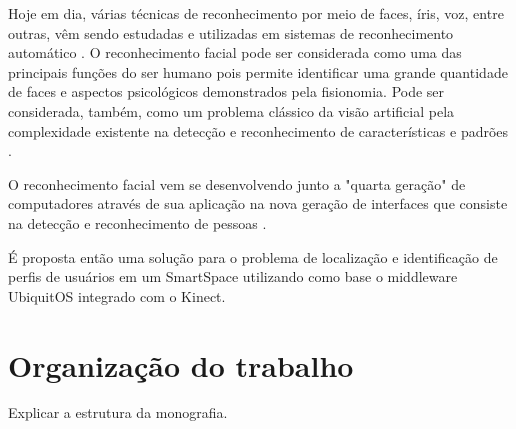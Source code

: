 Hoje em dia, várias técnicas de reconhecimento por meio de faces, íris, voz, entre outras, vêm sendo estudadas e utilizadas em sistemas de reconhecimento automático \cite{bolle}. O reconhecimento facial pode ser considerada como uma das principais funções do ser humano pois permite identificar uma grande quantidade de faces e aspectos psicológicos demonstrados pela fisionomia. Pode ser considerada, também, como um problema clássico da visão artificial pela complexidade existente na detecção e reconhecimento de características e padrões \cite{saocarlos}.

O reconhecimento facial vem se desenvolvendo junto a "quarta geração" de computadores através de sua aplicação na nova geração de interfaces que consiste na detecção e reconhecimento de pessoas \cite{saocarlos}.

É proposta então uma solução para o problema de localização e identificação de perfis de usuários em um SmartSpace utilizando como base o middleware UbiquitOS \cite{alegomes} integrado com o Kinect.

\section{Organização do trabalho}

	Explicar a estrutura da monografia.